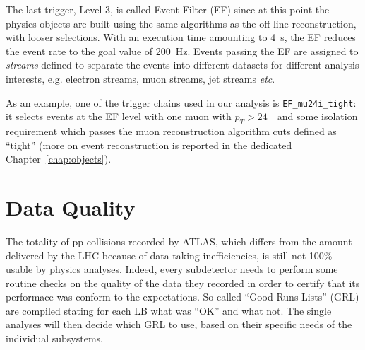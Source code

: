 The last trigger, Level 3, is called Event Filter (EF) since
at this point the physics objects are built using the same
algorithms as the off-line reconstruction, with looser selections. With an execution time
amounting to 4~s, the EF reduces the event rate to the goal value
of 200~Hz.
Events passing the EF are assigned to {\it streams} defined to separate
the events into different datasets for different analysis interests, e.g.
electron streams, muon streams, jet streams {\it etc}.

As an example, one of the trigger chains used in our analysis is 
\texttt{EF\_mu24i\_tight}: it selects events at the EF level with one 
muon with $p_T>24$~\gev\ and some isolation requirement which passes
the muon reconstruction algorithm cuts defined as ``tight''
(more on event reconstruction is reported in the dedicated Chapter~\ref{chap:objects}).

\section{Data Quality}\label{sec:daq}

The totality of pp collisions recorded by ATLAS, which differs from the amount
delivered by the LHC because of data-taking inefficiencies, is still
not 100\% usable by physics analyses. Indeed, every subdetector needs to
perform some routine checks %
on the quality of the data they recorded in order to certify that its performace
was conform to the expectations. So-called ``Good Runs Lists'' (GRL) are
compiled stating for each LB what was ``OK'' and what not.
The single analyses will then decide which GRL to use, based on their specific
needs of the individual subsystems.
